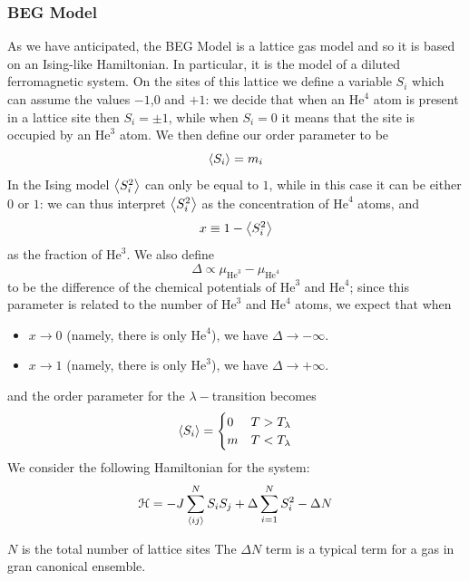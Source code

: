 \documentclass[../main/main.tex]{subfiles}
\begin{document}
\subsubsection{BEG Model}
As we have anticipated, the BEG Model is a lattice gas model and so it is based on an Ising-like Hamiltonian. In particular, it is the model of a diluted ferromagnetic system.
On the sites of this lattice we define a variable \(S_i\) which can assume the values \(-1\),\(0\) and \(+1\): we decide that when an \( \text{He}^4 \) atom is present in a lattice site then  \(S_{i}=\pm 1\), while when \(S_{i}= 0\) it means that the site is occupied by an \( \text{He}^3 \) atom.
We then define our order parameter to be
\begin{equation*}
     \expval{S_i} = m_i 
\end{equation*}
In the Ising model  \( \expval{S_i^2}  \) can only be equal to \(1\), while in this case it can be either \(0\) or \(1\): we can thus interpret \( \expval{S_i^2}  \) as the concentration of \( \text{He}^4 \) atoms, and
\begin{equation*}
  x \equiv 1 - \expval{S_i^2}
\end{equation*}
 as the fraction of \( \text{He}^3 \).
 We also define 
\begin{equation*}
  \Delta \propto \mu _{\text{He}^3} - \mu _{\text{He}^4}
\end{equation*}
to be the difference of the chemical potentials of \( \text{He}^3 \) and \( \text{He}^4 \); since this parameter is related to the number of \( \text{He}^3 \) and \( \text{He}^4 \) atoms, we expect that when
\begin{itemize}
\item \( x \rightarrow 0\)  (namely, there is only \( \text{He}^4 \)), we have \( \Delta \rightarrow - \infty  \).
\item \( x \rightarrow 1\)  (namely, there is only \( \text{He}^3 \)), we have \( \Delta \rightarrow + \infty  \).
\end{itemize}
and the order parameter for the \( \lambda - \)transition becomes
\begin{equation*}
\expval{S_i} =
  \begin{cases}
   0 & T > T_{\lambda }\\
   m & T < T_{\lambda }
  \end{cases}
\end{equation*}
We consider the following Hamiltonian for the system:
\begin{equation}
\mathcal{H} = - J \sum_{\expval{ij} }^{N} S_i S_j + \Delta \sum_{i=1}^{N} S_i^2 - \Delta N
\end{equation}
\begin{remark}
\(N\) is the total number of lattice sites
The \( \Delta N \) term is a typical term for a gas in gran canonical ensemble.  
\end{remark}
\end{document}
